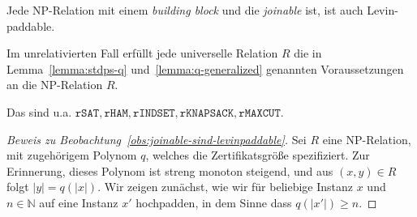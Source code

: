 \begin{observation}\label{obs:joinable-sind-levinpaddable}
    Jede NP-Relation mit einem \emph{building block} und die \emph{joinable} ist, ist auch Levin-paddable.
\end{observation}
\begin{corollary}
    Im unrelativierten Fall erfüllt jede universelle Relation $R$ die in 
    Lemma~\ref{lemma:stdps-q} und~\ref{lemma:q-generalized} genannten Voraussetzungen an die NP-Relation $R$.

    Das sind u.a. $\mathtt{rSAT}, \mathtt{rHAM}, \mathtt{rINDSET}, \mathtt{rKNAPSACK}, \mathtt{rMAXCUT}$.
\end{corollary}
\begin{proof}[Beweis zu Beobachtung~\ref{obs:joinable-sind-levinpaddable}]
    Sei $R$ eine NP-Relation, mit zugehörigem Polynom $q$, welches die Zertifikatsgröße spezifiziert. Zur Erinnerung, dieses Polynom ist streng monoton steigend, und aus $(x,y)\in R$ folgt $|y|=q(|x|)$.
    Wir zeigen zunächst, wie wir für beliebige Instanz $x$ und $n\in\mathbb N$ auf eine Instanz $x'$ hochpadden, in dem Sinne dass $q(|x'|) \geq n$.



\end{proof}
